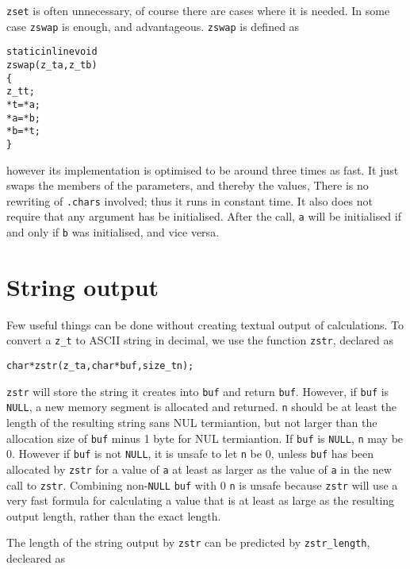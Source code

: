 {\tt zset} is often unnecessary, of course
there are cases where it is needed. In some case
{\tt zswap} is enough, and advantageous.
{\tt zswap} is defined as

\begin{alltt}
   \textcolor{c}{static inline} void
   zswap(z_t a, z_t b)
   \{
       z_t t;
       *t = *a;
       *a = *b;
       *b = *t;
   \}
\end{alltt}

\noindent
however its implementation is optimised to be
around three times as fast. It just swaps the members
of the parameters, and thereby the values, There
is no rewriting of {\tt .chars} involved; thus
it runs in constant time. It also does not
require that any argument has be initialised.
After the call, {\tt a} will be initialised
if and only if {\tt b} was initialised, and
vice versa.


\newpage
\section{String output}
\label{sec:String output}

Few useful things can be done without creating
textual output of calculations. To convert a
{\tt z\_t} to ASCII string in decimal, we use the
function {\tt zstr}, declared as

\begin{alltt}
   char *zstr(z_t a, char *buf, size_t n);
\end{alltt}

\noindent
{\tt zstr} will store the string it creates into
{\tt buf} and return {\tt buf}. However, if {\tt buf}
is {\tt NULL}, a new memory segment is allocated
and returned. {\tt n} should be at least the length
of the resulting string sans NUL termiantion, but
not larger than the allocation size of {\tt buf}
minus 1 byte for NUL termiantion. If {\tt buf} is
{\tt NULL}, {\tt n} may be 0. However if {\tt buf}
is not {\tt NULL}, it is unsafe to let {\tt n} be
0, unless {\tt buf} has been allocated by {\tt zstr}
for a value of {\tt a} at least as larger as the
value of {\tt a} in the new call to {\tt zstr}.
Combining non-\texttt{NULL} {\tt buf} with 0 {\tt n}
is unsafe because {\tt zstr} will use a very fast
formula for calculating a value that is at least
as large as the resulting output length, rather
than the exact length.

The length of the string output by {\tt zstr} can
be predicted by {\tt zstr\_length}, decleared as

